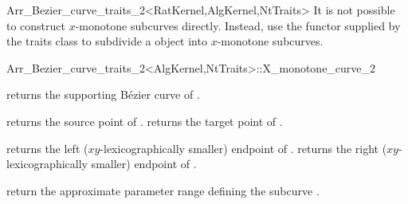 \begin{ccRefClass}{Arr_Bezier_curve_traits_2<RatKernel,AlgKernel,NtTraits>}
It is not possible to construct $x$-monotone subcurves directly. Instead,
use the  functor supplied by the traits class to
subdivide a  object into $x$-monotone subcurves.

\begin{ccClass}{Arr_Bezier_curve_traits_2<AlgKernel,NtTraits>::X_monotone_curve_2}

\ccAccessFunctions

  {returns the supporting B\'ezier curve of \ccVar.}

  {returns the source point of \ccVar.}
\ccGlue
{}
  {returns the target point of \ccVar.}

  {returns the left ($xy$-lexicographically smaller) endpoint of \ccVar.}
\ccGlue
{}
  {returns the right ($xy$-lexicographically smaller) endpoint of \ccVar.}

  {return the approximate parameter range defining the subcurve \ccVar.}

\end{ccClass}

\end{ccRefClass}
\ccRefPageEnd
